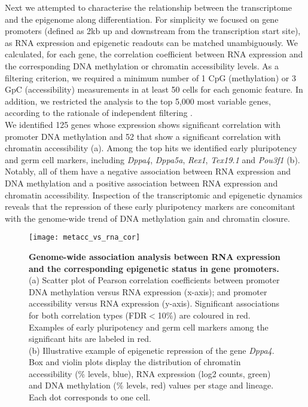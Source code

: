 Next we attempted to characterise the relationship between the transcriptome and the epigenome along differentiation. For simplicity we focused on gene promoters (defined as 2kb up and downstream from the transcription start site), as RNA expression and epigenetic readouts can be matched unambiguously. We calculated, for each gene, the correlation coefficient between RNA expression and the corresponding DNA methylation or chromatin accessibility levels. As a filtering criterion, we required a minimum number of 1 CpG
(methylation) or 3 GpC (accessibility) measurements in at least 50 cells for each genomic feature. In addition, we restricted the analysis to the top 5,000 most variable genes, according to the rationale of independent filtering \cite{Bourgon2010}.\\
We identified 125 genes whose expression shows significant correlation with promoter DNA methylation and 52 that show a significant correlation with chromatin accessibility (a). Among the top hits we identified early pluripotency and germ cell markers, including \textit{Dppa4}, \textit{Dppa5a}, \textit{Rex1}, \textit{Tex19.1} and \textit{Pou3f1} (b). Notably, all of them have a negative association between RNA expression and DNA methylation and a positive association between RNA expression and chromatin accessibility. Inspection of the transcriptomic and epigenetic dynamics reveals that the repression of these early pluripotency markers are concomitant with the genome-wide trend of DNA methylation gain and chromatin closure.

\begin{figure}[H]
	\centering
	\texttt{[image: metacc\_vs\_rna\_cor]}
	\caption[]{\textbf{Genome-wide association analysis between RNA expression and the corresponding epigenetic status in gene promoters.}\\
	(a) Scatter plot of Pearson correlation coefficients between promoter DNA methylation versus RNA expression (x-axis); and promoter accessibility versus RNA expression (y-axis). Significant associations for both correlation types (FDR$<$10\%) are coloured in red. Examples of early pluripotency and germ cell markers among the significant hits are labeled in red.\\
	(b) Illustrative example of epigenetic repression of the gene \textit{Dppa4}. Box and violin plots display the distribution of chromatin accessibility (\% levels, blue), RNA expression (log2 counts, green) and DNA methylation (\% levels, red) values per stage and lineage. Each dot corresponds to one cell.
	}
	\label{fig:metacc_vs_rna_cor}
\end{figure}

